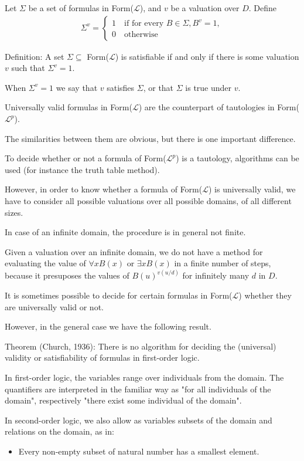 \documentclass{article}
\begin{document}
Let $\Sigma$ be a set of formulas in Form($\mathcal{L}$), and $v$ be a valuation over $D$. Define
\begin{align*}
\Sigma^v = \begin{cases}
1 \quad \text{if for every } B \in \Sigma, B^v = 1, \\
0 \quad \text{otherwise}
\end{cases}
\end{align*}

Definition: A set $\Sigma \subseteq$ Form($\mathcal{L}$) is satisfiable if and only if there is some valuation $v$ such that $\Sigma^v = 1$.

When $\Sigma^v = 1$ we say that $v$ satisfies $\Sigma$, or that $\Sigma$ is true under $v$. 

Universally valid formulas in Form($\mathcal{L}$) are the counterpart of tautologies in Form($\mathcal{L}^p$).

The similarities between them are obvious, but there is one important difference.

To decide whether or not a formula of Form($\mathcal{L}^p$) is a tautology, algorithms can be used (for instance the truth table method).

However, in order to know whether a formula of Form($\mathcal{L}$) is universally valid, we have to consider all possible valuations over all possible domains, of all different sizes.

In case of an infinite domain, the procedure is in general not finite.

Given a valuation over an infinite domain, we do not have a method for evaluating the value of $\forall x B(x)$ or $\exists x B(x)$ in a finite number of steps, because it presuposes the values of $B(u)^{v(u/d)}$ for infinitely many $d$ in $D$.

It is sometimes possible to decide for certain formulas in Form($\mathcal{L}$) whether they are universally valid or not.

However, in the general case we have the following result.

Theorem (Church, 1936): There is no algorithm for deciding the (universal) validity or satisfiability of formulas in first-order logic.

In first-order logic, the variables range over individuals from the domain. The quantifiers are interpreted in the familiar way as "for all individuals of the domain", respectively "there exist some individual of the domain". 

In second-order logic, we also allow as variables subsets of the domain and relations on the domain, as in:
\begin{itemize}
    \item Every non-empty subset of natural number has a smallest element.
\end{itemize}
\end{document}
